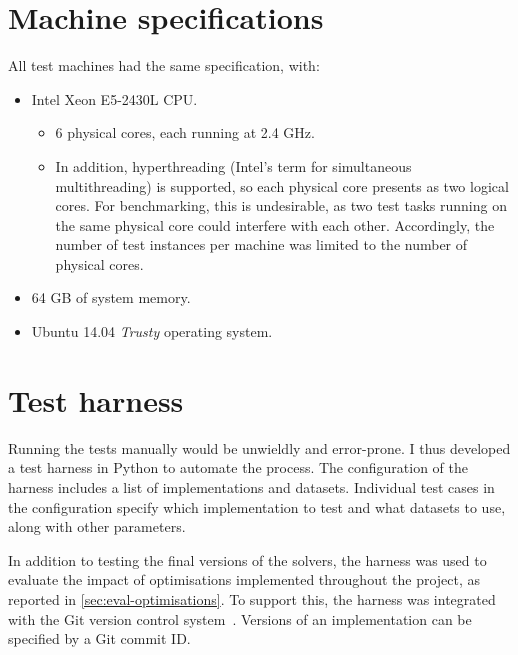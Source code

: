 \section{Machine specifications} \label{appendix:test-machine-spec}

All test machines had the same specification, with:
\begin{itemize}
    \item Intel Xeon E5-2430L CPU.
    \begin{itemize}
        \item 6 physical cores, each running at 2.4 GHz.
        \item In addition, hyperthreading (Intel's term for simultaneous multithreading) is supported, so each physical core presents as two logical cores. For benchmarking, this is undesirable, as two test tasks running on the same physical core could interfere with each other. Accordingly, the number of test instances per machine was limited to the number of physical cores.
    \end{itemize}
    \item 64 GB of system memory.
    \item Ubuntu 14.04 \textit{Trusty} operating system.
\end{itemize}

\section{Test harness} \label{appendix:impl-benchmark-harness}

Running the tests manually would be unwieldly and error-prone. I thus developed a test harness in Python to automate the process. The configuration of the harness includes a list of implementations and datasets. Individual test cases in the configuration specify which implementation to test and what datasets to use, along with other parameters.

In addition to testing the final versions of the solvers, the harness was used to evaluate the impact of optimisations implemented throughout the project, as reported in \cref{sec:eval-optimisations}. To support this, the harness was integrated with the Git version control system~\cite{GitWWW}. Versions of an implementation can be specified by a Git commit ID.

